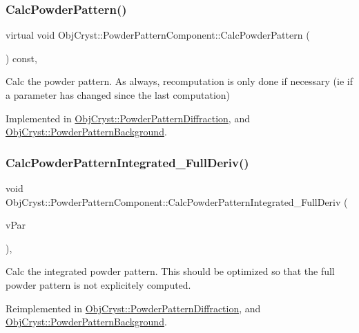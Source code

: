 \subsubsection{\texorpdfstring{CalcPowderPattern()}{CalcPowderPattern()}}
{\footnotesize\ttfamily virtual void Obj\+Cryst\+::\+Powder\+Pattern\+Component\+::\+Calc\+Powder\+Pattern (\begin{DoxyParamCaption}{ }\end{DoxyParamCaption}) const\hspace{0.3cm}{\ttfamily [protected]}, {}}

Calc the powder pattern. As always, recomputation is only done if necessary (ie if a parameter has changed since the last computation) 

Implemented in \mbox{\hyperlink{class_obj_cryst_1_1_powder_pattern_diffraction_a4c7d61b5c105ee235629a4dfdbdf9949}{Obj\+Cryst\+::\+Powder\+Pattern\+Diffraction}}, and \mbox{\hyperlink{class_obj_cryst_1_1_powder_pattern_background_a6e564159536442870bfb17be8e5b51e8}{Obj\+Cryst\+::\+Powder\+Pattern\+Background}}.

\mbox{\label{class_obj_cryst_1_1_powder_pattern_component_a7825422fec4a6ee5f1a00bc4063104ef}} 
\subsubsection{\texorpdfstring{CalcPowderPatternIntegrated\_FullDeriv()}{CalcPowderPatternIntegrated\_FullDeriv()}}
{\footnotesize\ttfamily void Obj\+Cryst\+::\+Powder\+Pattern\+Component\+::\+Calc\+Powder\+Pattern\+Integrated\+\_\+\+Full\+Deriv (\begin{DoxyParamCaption}\item[{std\+::set$<$ Refinable\+Par $\ast$ $>$ \&}]{v\+Par }\end{DoxyParamCaption})\hspace{0.3cm}{\ttfamily [protected]}, {\ttfamily [virtual]}}

Calc the integrated powder pattern. This should be optimized so that the full powder pattern is not explicitely computed. 

Reimplemented in \mbox{\hyperlink{class_obj_cryst_1_1_powder_pattern_diffraction_a47a3a1e09d0ab4c4f092384650db3efd}{Obj\+Cryst\+::\+Powder\+Pattern\+Diffraction}}, and \mbox{\hyperlink{class_obj_cryst_1_1_powder_pattern_background_a044838d76b1878a029d587480636e80e}{Obj\+Cryst\+::\+Powder\+Pattern\+Background}}.

